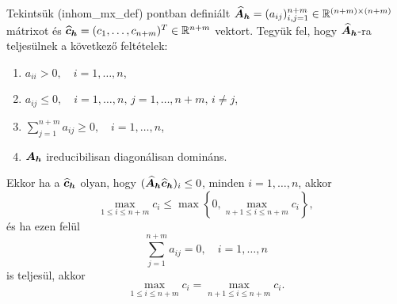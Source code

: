 \begin{theorem}\label{mx_max_tetel}
	Tekintsük \aref({inhom_mx_def}) pontban definiált $\bm{\widehat{A}_h} = (a_{ij})_{i,j=1}^{n+m} \in \mathbb{R}^{(n+m) \times (n+m)}$ mátrixot és $\bm{\widehat{c}_h} = (c_1, \ldots, c_{n+m})^T \in \mathbb{R}^{n+m}$ vektort. Tegyük fel, hogy $\bm{\widehat{A}_h}$-ra teljesülnek a következő feltételek:
	\begin{enumerate}[label=(\roman*)]
		\item $a_{ii} > 0, \quad i = 1, \ldots, n$,\label{A_diag_poz}
		\item $a_{ij} \leq 0, \quad i = 1, \ldots, n,\, j = 1, \ldots, n+m,\, i \neq j$,
		\item $\displaystyle \sum_{j = 1}^{n+m} a_{ij} \geq 0,  \quad i = 1, \ldots, n$, \label{nemneg_sorosszeg}
		\item $\bm{A_h}$ ireducibilisan diagonálisan domináns.\label{A_irreddd}
	\end{enumerate}
	Ekkor ha a $\bm{\widehat{c}_h}$ olyan, hogy $(\bm{\widehat{A}_h} \bm{\widehat{c}_h})_i \leq 0 $, minden $i = 1, \ldots, n$, akkor
	\begin{equation}\label{eq:cDMP_mx}
		\max_{ 1 \leq i \leq n+m} c_i \leq \max \left\{0, \max_{n+1 \leq i \leq n+m} c_i \right\},
	\end{equation}
	és ha ezen felül 
	\begin{equation}\label{eq:nullsorosszeg_felt}
		\sum_{j = 1}^{n+m} a_{ij} = 0,  \quad i = 1, \ldots, n
	\end{equation}
	is teljesül, akkor
	\begin{equation}\label{eq:cDMP_mx_0q}
		\max_{1 \leq i \leq n+m} c_i =  \max_{n+1 \leq i \leq n+m} c_i .
	\end{equation}
\end{theorem}

